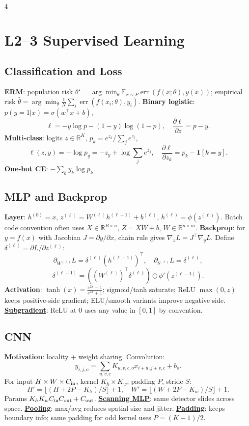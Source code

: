 \documentclass{article}
\newcommand{\key}[1]{\textbf{#1}}
\newcommand{\lowterm}[1]{\textbf{\underline{#1}}}
\newcommand{\R}{\mathbb{R}}
\newcommand{\E}{\mathbb{E}}
\newcommand{\1}{\mathbf 1}
\begin{document}
\tiny
\begin{multicols*}{4}

\section{L2--3 Supervised Learning}
\subsection{Classification and Loss}
\key{ERM}: population risk $\theta^\star=\arg\min_\theta\E_{x\sim P}\operatorname{err}(f(x;\theta),y(x))$; empirical risk $\hat\theta=\arg\min_\theta\frac1N\sum_i\operatorname{err}(f(x_i;\theta),y_i)$. \key{Binary logistic}: $p(y=1|x)=\sigma(w^\top x+b)$,
\[
\ell=-y\log p-(1-y)\log(1-p),\quad \frac{\partial\ell}{\partial z}=p-y.
\]
\key{Multi-class}: logits $z\in\R^K$, $p_k=e^{z_k}/\sum_j e^{z_j}$,
\[
\ell(z,y)=-\log p_y=-z_y+\log\sum_j e^{z_j},\quad
\frac{\partial\ell}{\partial z_k}=p_k-\1[k=y].
\]
\lowterm{One-hot CE}: $-\sum_k y_k\log p_k$.

\subsection{MLP and Backprop}
\key{Layer}: $h^{(0)}=x$, $z^{(\ell)}=W^{(\ell)}h^{(\ell-1)}+b^{(\ell)}$, $h^{(\ell)}=\phi(z^{(\ell)})$. Batch code convention often uses $X\in\R^{B\times n}$, $Z=XW+b$, $W\in\R^{n\times m}$.
\key{Backprop}: for $y=f(x)$ with Jacobian $J=\partial y/\partial x$, chain rule gives $\nabla_xL=J^\top\nabla_yL$. Define $\delta^{(\ell)}=\partial L/\partial z^{(\ell)}$:
\[
\partial_{W^{(\ell)}}L=\delta^{(\ell)}(h^{(\ell-1)})^\top,\quad
\partial_{b^{(\ell)}}L=\delta^{(\ell)},
\]
\[
\delta^{(\ell-1)}=((W^{(\ell)})^\top\delta^{(\ell)})\odot\phi'(z^{(\ell-1)}).
\]
\key{Activation}: $\tanh(x)=\frac{e^{2x}-1}{e^{2x}+1}$; sigmoid/tanh saturate; ReLU $\max(0,z)$ keeps positive-side gradient; ELU/smooth variants improve negative side. \lowterm{Subgradient}: ReLU at $0$ uses any value in $[0,1]$ by convention.

\subsection{CNN}
\key{Motivation}: locality + weight sharing. Convolution:
\[
y_{i,j,o}=\sum_{u,v,c}K_{u,v,c,o}x_{i+u,j+v,c}+b_o.
\]
For input $H\times W\times C_{\rm in}$, kernel $K_h\times K_w$, padding $P$, stride $S$:
\[
H'=\lfloor(H+2P-K_h)/S\rfloor+1,\quad
W'=\lfloor(W+2P-K_w)/S\rfloor+1.
\]
Params $K_hK_wC_{\rm in}C_{\rm out}+C_{\rm out}$. \lowterm{Scanning MLP}: same detector slides across space. \lowterm{Pooling}: max/avg reduces spatial size and jitter. \lowterm{Padding}: keeps boundary info; same padding for odd kernel uses $P=(K-1)/2$.


\end{multicols*}
\end{document}
